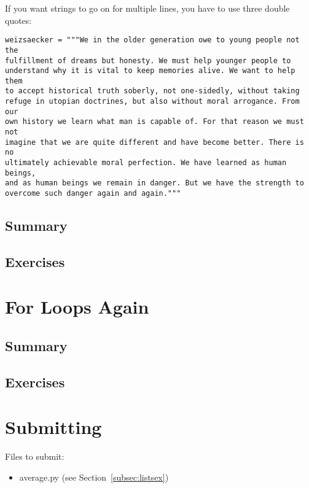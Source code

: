 \documentclass[11pt]{cselabheader}
\begin{document}
If you want strings to go on for multiple lines, you have to use three double
quotes:
\begin{lstlisting}
weizsaecker = """We in the older generation owe to young people not the 
fulfillment of dreams but honesty. We must help younger people to 
understand why it is vital to keep memories alive. We want to help them 
to accept historical truth soberly, not one-sidedly, without taking 
refuge in utopian doctrines, but also without moral arrogance. From our
own history we learn what man is capable of. For that reason we must not
imagine that we are quite different and have become better. There is no
ultimately achievable moral perfection. We have learned as human beings,
and as human beings we remain in danger. But we have the strength to 
overcome such danger again and again."""
\end{lstlisting} 

\subsection{Summary}

\subsection{Exercises}
\label{subsec:stringsex}

\section{For Loops Again}
\subsection{Summary}

\subsection{Exercises}
\label{subsec:forex}


\pagebreak
\section{Submitting}

Files to submit:
\begin{itemize}
  \item average.py (see Section~\ref{subsec:listsex})
\end{itemize}
\end{document}

